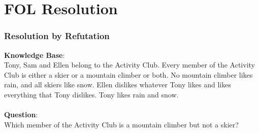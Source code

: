\documentclass[compress, 9pt]{beamer}
\begin{document}
\section{FOL Resolution}
\label{sec-4}
\begin{frame}
\frametitle{Resolution by Refutation}
\label{sec-4-1}

\textbf{Knowledge Base}: \\
Tony, Sam and Ellen belong to the Activity Club. Every member of the
Activity Club is either a skier or a mountain climber or both. No mountain
climber likes rain, and all skiers like snow. Ellen dislikes whatever
Tony likes and likes everything that Tony dislikes. Tony likes rain and snow.
\\
\\

\textbf{Question}: \\
Which member of the Activity Club is a mountain climber but not a skier?
\end{frame}
\end{document}
